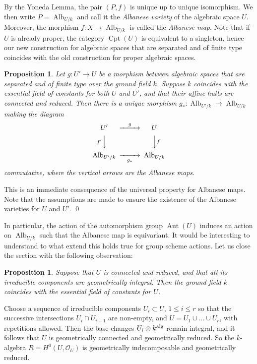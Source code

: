 \documentclass[oneside, 12pt]{amsart}
\newtheorem{proposition}[theorem]{Proposition}
\theoremstyle{definition}
\theoremstyle{remark}
\newcommand{\alg}{\text{\rm alg}}
\newcommand{\Alb}{\operatorname{Alb}}
\newcommand{\Aut}{\operatorname{Aut}}
\renewcommand{\O}{\mathscr{O}}
\newcommand{\ra}{\rightarrow}
\newcommand{\Cpt}{\operatorname{Cpt}}
\begin{document}
\medskip
By the Yoneda Lemma, the pair $(P,f)$ is unique up to unique isomorphism.
We then write $P=\Alb_{U/k}$ and call it the \emph{Albanese variety} of the algebraic space $U$.
Moreover, the morphism $f:X\ra\Alb_{U/k}$ is called the \emph{Albanese map}.
Note that if $U$ is already proper, the category $\Cpt(U)$ is equivalent to a singleton, 
hence our new construction for algebraic spaces that are separated and of finite type coincides with the
old construction for proper algebraic spaces.

\begin{proposition}
Let $g:U'\ra U$ be a morphism between   algebraic spaces that are separated and of finite type over the ground field $k$.
Suppose $k$ coincides with the essential field of constants  for both $U$ and $U'$, and that their
affine hulls are connected and reduced.
Then there is a unique morphism $g_*:\Alb_{U'/k}\ra\Alb_{U/k}$ making the diagram
$$
\begin{CD}
U'	@>g>>	U\\
@Vf'VV		@VVfV\\
\Alb_{U'/k}	@>>g_*>	\Alb_{U/k}
\end{CD}
$$
commutative, where the vertical arrows are the Albanese maps.
\end{proposition}

\proof
This is an immediate consequence of the universal property for Albanese maps. Note that the assumptions are made to 
ensure the existence of the Albanese varieties for $U$ and $U'$.
\qed

\medskip
In particular, the action of the automorphism group $\Aut(U)$   induces an action on $\Alb_{U/k}$ such that
the Albanese map is equivariant. It would be interesting to understand to what extend this holds true
for group scheme actions. Let us close the section with the following observation:

\begin{proposition}
Suppose that $U$ is connected and reduced, and that all  its irreducible components are geometrically integral.
Then the ground field $k$ coincides with the essential   field of constants for $U$.
\end{proposition}

\proof
Choose a sequence of irreducible components $U_i\subset U$, $1\leq i\leq r$  so that the successive intersections $U_i\cap U_{i+1}$ 
are non-empty, and $U=U_1\cup\ldots\cup U_r$, with repetitions allowed. Then the base-changes $U_i\otimes k^\alg$
remain   integral, and it follows that $U$ is geometrically connected and geometrically reduced.
So the  $k$-algebra $R=H^0(U,\O_U)$ is geometrically indecomposable and geometrically reduced.
\end{document}
